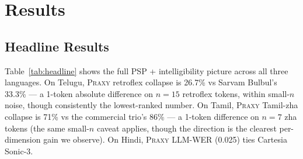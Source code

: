 \documentclass[conference,a4paper]{IEEEtran}
\newcommand{\psp}{\textsc{PSP}}
\newcommand{\praxy}{\textsc{Praxy}}
\begin{document}
\section{Results}
\label{sec:results}


\subsection{Headline Results}
\label{sec:headline}
Table~\ref{tab:headline} shows the full \psp{} + intelligibility picture across all three languages. On Telugu, \praxy{} retroflex collapse is 26.7\% vs Sarvam Bulbul's 33.3\% --- a 1-token absolute difference on $n=15$ retroflex tokens, within small-$n$ noise, though consistently the lowest-ranked number. On Tamil, \praxy{} Tamil-zha collapse is 71\% vs the commercial trio's 86\% --- a 1-token difference on $n=7$ zha tokens (the same small-$n$ caveat applies, though the direction is the clearest per-dimension gain we observe). On Hindi, \praxy{} LLM-WER (0.025) ties Cartesia Sonic-3.
\end{document}

